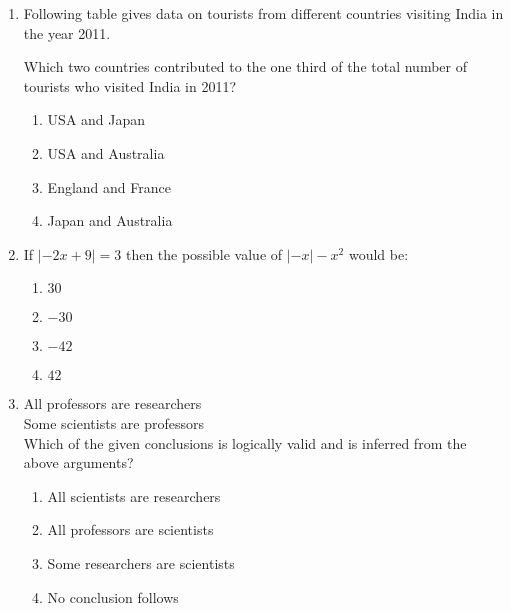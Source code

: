 \documentclass[journal]{IEEEtran}
\begin{document}
\begin{enumerate}
\item Following table gives data on tourists from different countries visiting India in the year 2011.

\begin{table}[h!]    
  \centering
  
\end{table}

Which two countries contributed to the one third of the total number of tourists who visited India in 2011?

\begin{enumerate}
    \item USA and Japan
    \item USA and Australia
    \item England and France
    \item Japan and Australia\\
\end{enumerate}

\item If $| -2x + 9 | = 3$ then the possible value of $| -x| - x^2$ would be:

\begin{enumerate}
    \item $30$
    \item $-30$
    \item $-42$
    \item $42$\\
\end{enumerate}
\item All professors are researchers\\
Some scientists are professors\\

Which of the given conclusions is logically valid and is inferred from the above arguments?

\begin{enumerate}
    \item All scientists are researchers
    \item All professors are scientists
    \item Some researchers are scientists
    \item No conclusion follows
\end{enumerate}


\end{enumerate}
\end{document}
